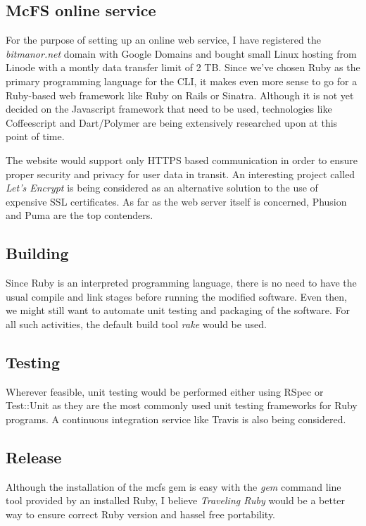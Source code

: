 \subsection{McFS online service}
For the purpose of setting up an online web service, I have registered the \emph{bitmanor.net} domain with Google Domains and bought small Linux hosting from Linode with a montly data transfer limit of 2 TB. Since we've chosen Ruby as the primary programming language for the CLI, it makes even more sense to go for a Ruby-based web framework like Ruby on Rails or Sinatra. Although it is not yet decided on the Javascript framework that need to be used, technologies like Coffeescript and Dart/Polymer are being extensively researched upon at this point of time.

The website would support only HTTPS based communication in order to ensure proper security and privacy for user data in transit. An interesting project called \emph{Let's Encrypt} is being considered as an alternative solution to the use of expensive SSL certificates. As far as the web server itself is concerned, Phusion and Puma are the top contenders.

\subsection{Building}
Since Ruby is an interpreted programming language, there is no need to have the usual compile and link stages before running the modified software. Even then, we might still want to automate unit testing and packaging of the software. For all such activities, the default build tool \emph{rake} would be used.

\subsection{Testing}

Wherever feasible, unit testing would be performed either using RSpec or Test::Unit as they are the most commonly used unit testing frameworks for Ruby programs. A continuous integration service like Travis is also being considered.

\subsection{Release}
Although the installation of the mcfs gem is easy with the \emph{gem} command line tool provided by an installed Ruby, I believe \emph{Traveling Ruby} would be a better way to ensure correct Ruby version and hassel free portability.

